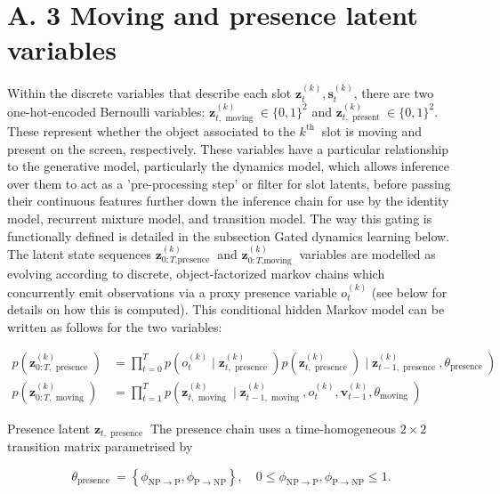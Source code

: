 \documentclass[10pt]{article}
\begin{document}
\section*{A. 3 Moving and presence latent variables}
Within the discrete variables that describe each slot $\mathbf{z}_{t}^{(k)}, \mathbf{s}_{t}^{(k)}$, there are two one-hot-encoded Bernoulli variables: $\mathbf{z}_{t, \text { moving }}^{(k)} \in\{0,1\}^{2}$ and $\mathbf{z}_{t, \text { present }}^{(k)} \in\{0,1\}^{2}$. These represent whether the object associated to the $k^{\text {th }}$ slot is moving and present on the screen, respectively. These variables have a particular relationship to the generative model, particularly the dynamics model, which allows inference over them to act as a 'pre-processing step' or filter for slot latents, before passing their continuous features further down the inference chain for use by the identity model, recurrent mixture model, and transition model. The way this gating is functionally defined is detailed in the subsection Gated dynamics learning below.\\
The latent state sequences $\mathbf{z}_{0: T \text {,presence }}^{(k)}$ and $\mathbf{z}_{0: T \text {,moving }}^{(k)}$ variables are modelled as evolving according to discrete, object-factorized markov chains which concurrently emit observations via a proxy presence variable $o_{t}^{(k)}$ (see below for details on how this is computed). This conditional hidden Markov model can be written as follows for the two variables:


\begin{align*}
p\left(\mathbf{z}_{0: T, \text { presence }}^{(k)}\right) & \left.=\prod_{t=0}^{T} p\left(o_{t}^{(k)} \mid \mathbf{z}_{t, \text { presence }}^{(k)}\right) p\left(\mathbf{z}_{t, \text { presence }}^{(k)}\right) \mid \mathbf{z}_{t-1, \text { presence }}^{(k)}, \theta_{\text {presence }}\right) \\
p\left(\mathbf{z}_{0: T, \text { moving }}^{(k)}\right) & =\prod_{t=1}^{T} p\left(\mathbf{z}_{t, \text { moving }}^{(k)} \mid \mathbf{z}_{t-1, \text { moving }}^{(k)}, o_{t}^{(k)}, \mathbf{v}_{t-1}^{(k)}, \theta_{\text {moving }}\right) \tag{16}
\end{align*}


Presence latent $\mathbf{z}_{t, \text { presence }}$ The presence chain uses a time-homogeneous $2 \times 2$ transition matrix parametrised by

$$
\theta_{\text {presence }}=\left\{\phi_{\mathrm{NP} \rightarrow \mathrm{P}}, \phi_{\mathrm{P} \rightarrow \mathrm{NP}}\right\}, \quad 0 \leq \phi_{\mathrm{NP} \rightarrow \mathrm{P}}, \phi_{\mathrm{P} \rightarrow \mathrm{NP}} \leq 1 .
$$
\end{document}
